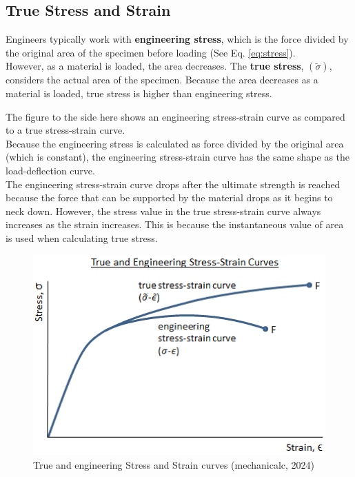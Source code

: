 \documentclass{article}
\begin{document}
    \subsection{True Stress and Strain}
    Engineers typically work with \textbf{engineering stress}, which is the force divided by the original area of the specimen before loading (See Eq. \ref{eq:stress}).\\[8pt] However, as a material is loaded, the area decreases. The \textbf{true stress}, $(\tilde{\sigma})$, considers the actual area of the specimen. Because the area decreases as a material is loaded, true stress is higher than engineering stress.\\[8pt]
    \begin{minipage}{0.45\textwidth}
        The figure to the side here shows an engineering stress-strain curve as compared to a true stress-strain curve.\\[8pt]
        Because the engineering stress is calculated as force divided by the original area (which is constant), the engineering stress-strain curve has the same shape as the load-deflection curve.\\[8pt] 
        The engineering stress-strain curve drops after the ultimate strength is reached because the force that can be supported by the material drops as it begins to neck down. However, the stress value in the true stress-strain curve always increases as the strain increases. This is because the instantaneous value of area is used when calculating true stress.
    \end{minipage}\hfill
    \begin{minipage}{0.5\textwidth}
    \begin{figure}[H]
        \centering
        \includegraphics[width=1\textwidth]{images/true-stress-strain-diagram-01.png}
        \caption{True and engineering Stress and Strain curves (mechanicalc, 2024)}
        \label{fig:tvn}
    \end{figure}
    \end{minipage}\\[8pt]
\end{document}
